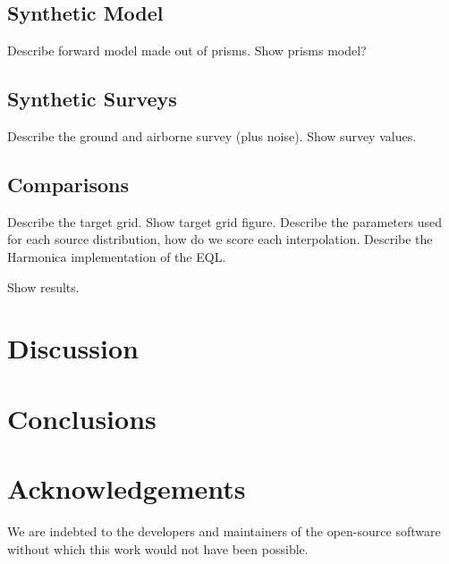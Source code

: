 \documentclass[twocolumn]{article}
\begin{document}
\subsection{Synthetic Model}

Describe forward model made out of prisms.
Show prisms model?

\subsection{Synthetic Surveys}

Describe the ground and airborne survey (plus noise).
Show survey values.

\subsection{Comparisons}

Describe the target grid. Show target grid figure.
Describe the parameters used for each source distribution, how do we score each interpolation.
Describe the Harmonica implementation of the EQL.

Show results.


\section{Discussion}


\section{Conclusions}


\section{Acknowledgements}

We are indebted to the developers and maintainers of the open-source software without
which this work would not have been possible.




\end{document}
